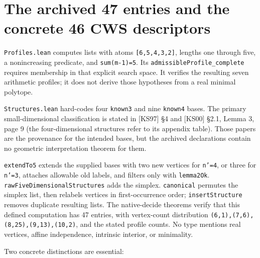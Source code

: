 \documentclass[11pt,a4paper,oneside]{report}
\begin{document}
\section{The archived 47 entries and the concrete 46 CWS
descriptors}\label{minimal-ip-circuits-and-types--the-archived-47-entries-and-the-concrete-46-cws-descriptors}

\texttt{Profiles\allowbreak{}.\allowbreak{}lean} computes lists with
atoms
\texttt{[\allowbreak{}6,\allowbreak{}5,\allowbreak{}4,\allowbreak{}3,\allowbreak{}2]},
lengths one through five, a nonincreasing predicate, and
\texttt{sum(\allowbreak{}m-\allowbreak{}1)\allowbreak{}=\allowbreak{}5}.
Its
\texttt{admissib\allowbreak{}leProfil\allowbreak{}e\_\allowbreak{}complete}
requires membership in that explicit search space. It verifies the
resulting seven arithmetic profiles; it does not derive those hypotheses
from a real minimal polytope.

\texttt{Structur\allowbreak{}es.\allowbreak{}lean} hard-codes four
\texttt{known3} and nine \texttt{known4} bases. The primary
small-dimensional classification is stated in {[}KS97{]} §4 and
{[}KS00{]} §2.1, Lemma 3, page 9 (the four-dimensional structures refer
to its appendix table). Those papers are the provenance for the intended
bases, but the archived declarations contain no geometric interpretation
theorem for them.

\texttt{extendTo\allowbreak{}5} extends the supplied bases with two new
vertices for \texttt{n'=\allowbreak{}4}, or three for
\texttt{n'=\allowbreak{}3}, attaches allowable old labels, and filters
only with \texttt{lemma2Ok}.
\texttt{rawFiveD\allowbreak{}imension\allowbreak{}alStruct\allowbreak{}ures}
adds the simplex. \texttt{canonica\allowbreak{}l} permutes the simplex
list, then relabels vertices in first-occurrence order;
\texttt{insertSt\allowbreak{}ructure} removes duplicate resulting lists.
The native-decide theorems verify that this defined computation has 47
entries, with vertex-count distribution
\texttt{(\allowbreak{}6,\allowbreak{}1)\allowbreak{},\allowbreak{}(\allowbreak{}7,\allowbreak{}6)\allowbreak{},\allowbreak{}(\allowbreak{}8,\allowbreak{}25)\allowbreak{},\allowbreak{}(\allowbreak{}9,\allowbreak{}13)\allowbreak{},\allowbreak{}(\allowbreak{}10,\allowbreak{}2)},
and the stated profile counts. No type mentions real vertices, affine
independence, intrinsic interior, or minimality.

Two concrete distinctions are essential:
\end{document}
